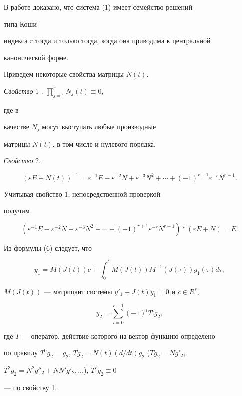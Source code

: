В работе \cite{Chi} доказано, что система (1) имеет семейство решений


типа Коши


индекса $r$ тогда и только тогда, когда она приводима к центральной


канонической форме.





Приведем некоторые свойства матрицы $N(t)$.


\medskip





{\it Свойство} 1 \cite{Boy}. $\prod\limits^r_{j=1}N_j(t)\equiv 0$,


где в


качестве $N_j$ могут выступать любые производные


матрицы $N(t)$, в том числе и нулевого порядка.


\medskip





{\it Свойство} 2.


$$


(\varepsilon E+N(t))^{-1}=\varepsilon^{-1}E-\varepsilon^{-2}N+


\varepsilon^{-3}N^2+\dotsb+(-1)^{r+1}\varepsilon^{-r}N^{r-1}.


$$


\begin{pf} Учитывая свойство 1, непосредственной проверкой


получим


$$


(\varepsilon^{-1}E-\varepsilon^{-2}N+\varepsilon^{-3}N^2+\dotsb+


(-1)^{r+1}\varepsilon^{-r}N^{r-1})\ast


(\varepsilon E+N)=E.


$$


Из формулы (6) следует, что


\begin{equation}


y_1=M(J(t))c+\int^t_0 M(J(t))M^{-1}(J(\tau))g_1(\tau)d\tau,


\end{equation}


$M(J(t))$ --- матрицант системы $y'_1+J(t)y_1=0$ и $c\in R^s$,


\begin{equation}


y_2=\sum^{r-1}_{i=0}(-1)^i T^ig_2,


\end{equation}


где $T$ --- оператор, действие которого на вектор-функцию определено


по правилу $T^0g_2=g_2$, $Tg_2=N(t)(d/dt)g_2$ ($Tg_2=Ng'_2$,


$T^2g_2=N^2g''_2+NN'g'_2,\dotsc$), $T^rg_2\equiv 0$


--- по свойству 1.


\end{pf}






